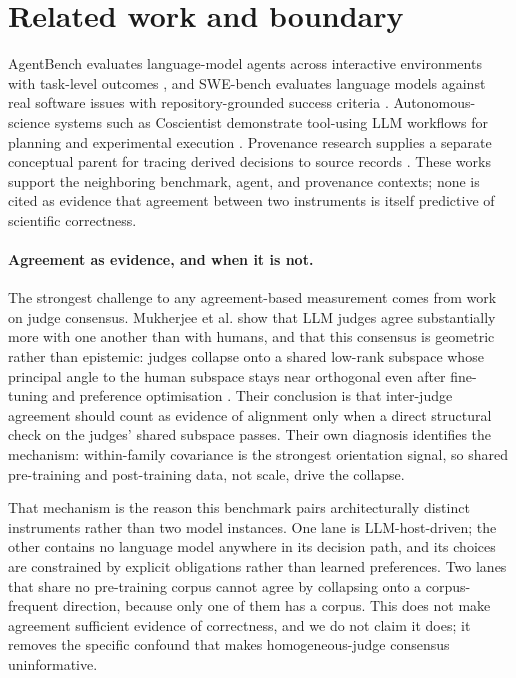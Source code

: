 \section{Related work and boundary}

AgentBench evaluates language-model agents across interactive environments with task-level outcomes \cite{liu2024agentbench}, and SWE-bench evaluates language models against real software issues with repository-grounded success criteria \cite{jimenez2024swebench}. Autonomous-science systems such as Coscientist demonstrate tool-using LLM workflows for planning and experimental execution \cite{boiko2023autonomous}. Provenance research supplies a separate conceptual parent for tracing derived decisions to source records \cite{buneman2001provenance}. These works support the neighboring benchmark, agent, and provenance contexts; none is cited as evidence that agreement between two instruments is itself predictive of scientific correctness.

\paragraph{Agreement as evidence, and when it is not.}
The strongest challenge to any agreement-based measurement comes from work on judge consensus. Mukherjee et al. show that LLM judges agree substantially more with one another than with humans, and that this consensus is geometric rather than epistemic: judges collapse onto a shared low-rank subspace whose principal angle to the human subspace stays near orthogonal even after fine-tuning and preference optimisation \cite{mukherjee2026geometry}. Their conclusion is that inter-judge agreement should count as evidence of alignment only when a direct structural check on the judges' shared subspace passes. Their own diagnosis identifies the mechanism: within-family covariance is the strongest orientation signal, so shared pre-training and post-training data, not scale, drive the collapse.

That mechanism is the reason this benchmark pairs architecturally distinct instruments rather than two model instances. One lane is LLM-host-driven; the other contains no language model anywhere in its decision path, and its choices are constrained by explicit obligations rather than learned preferences. Two lanes that share no pre-training corpus cannot agree by collapsing onto a corpus-frequent direction, because only one of them has a corpus. This does not make agreement sufficient evidence of correctness, and we do not claim it does; it removes the specific confound that makes homogeneous-judge consensus uninformative.

